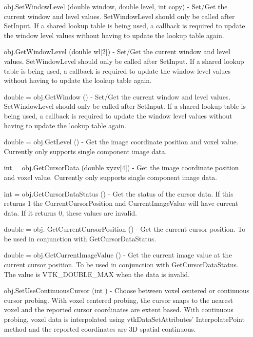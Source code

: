 \begin{DoxyItemize}
\item {\ttfamily obj.\-Set\-Window\-Level (double window, double level, int copy)} -\/ Set/\-Get the current window and level values. Set\-Window\-Level should only be called after Set\-Input. If a shared lookup table is being used, a callback is required to update the window level values without having to update the lookup table again.  
\item {\ttfamily obj.\-Get\-Window\-Level (double wl\mbox{[}2\mbox{]})} -\/ Set/\-Get the current window and level values. Set\-Window\-Level should only be called after Set\-Input. If a shared lookup table is being used, a callback is required to update the window level values without having to update the lookup table again.  
\item {\ttfamily double = obj.\-Get\-Window ()} -\/ Set/\-Get the current window and level values. Set\-Window\-Level should only be called after Set\-Input. If a shared lookup table is being used, a callback is required to update the window level values without having to update the lookup table again.  
\item {\ttfamily double = obj.\-Get\-Level ()} -\/ Get the image coordinate position and voxel value. Currently only supports single component image data.  
\item {\ttfamily int = obj.\-Get\-Cursor\-Data (double xyzv\mbox{[}4\mbox{]})} -\/ Get the image coordinate position and voxel value. Currently only supports single component image data.  
\item {\ttfamily int = obj.\-Get\-Cursor\-Data\-Status ()} -\/ Get the status of the cursor data. If this returns 1 the Current\-Cursor\-Position and Current\-Image\-Value will have current data. If it returns 0, these values are invalid.  
\item {\ttfamily double = obj. Get\-Current\-Cursor\-Position ()} -\/ Get the current cursor position. To be used in conjunction with Get\-Cursor\-Data\-Status.  
\item {\ttfamily double = obj.\-Get\-Current\-Image\-Value ()} -\/ Get the current image value at the current cursor position. To be used in conjunction with Get\-Cursor\-Data\-Status. The value is V\-T\-K\-\_\-\-D\-O\-U\-B\-L\-E\-\_\-\-M\-A\-X when the data is invalid.  
\item {\ttfamily obj.\-Set\-Use\-Continuous\-Cursor (int )} -\/ Choose between voxel centered or continuous cursor probing. With voxel centered probing, the cursor snaps to the nearest voxel and the reported cursor coordinates are extent based. With continuous probing, voxel data is interpolated using vtk\-Data\-Set\-Attributes' Interpolate\-Point method and the reported coordinates are 3\-D spatial continuous.  

\end{DoxyItemize}
